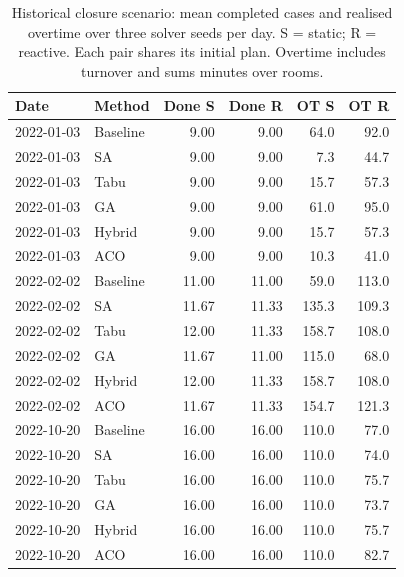 \begin{table}[H]
\centering\small
\caption{Historical closure scenario: mean completed cases and realised overtime over three solver seeds per day. S = static; R = reactive. Each pair shares its initial plan. Overtime includes turnover and sums minutes over rooms.}
\label{tab:room-historical}
\begin{tabular}{@{}llrrrr@{}}
\toprule
Date & Method & Done S & Done R & OT S & OT R \\
\midrule
2022-01-03 & Baseline & 9.00 & 9.00 & 64.0 & 92.0 \\
2022-01-03 & SA & 9.00 & 9.00 & 7.3 & 44.7 \\
2022-01-03 & Tabu & 9.00 & 9.00 & 15.7 & 57.3 \\
2022-01-03 & GA & 9.00 & 9.00 & 61.0 & 95.0 \\
2022-01-03 & Hybrid & 9.00 & 9.00 & 15.7 & 57.3 \\
2022-01-03 & ACO & 9.00 & 9.00 & 10.3 & 41.0 \\
2022-02-02 & Baseline & 11.00 & 11.00 & 59.0 & 113.0 \\
2022-02-02 & SA & 11.67 & 11.33 & 135.3 & 109.3 \\
2022-02-02 & Tabu & 12.00 & 11.33 & 158.7 & 108.0 \\
2022-02-02 & GA & 11.67 & 11.00 & 115.0 & 68.0 \\
2022-02-02 & Hybrid & 12.00 & 11.33 & 158.7 & 108.0 \\
2022-02-02 & ACO & 11.67 & 11.33 & 154.7 & 121.3 \\
2022-10-20 & Baseline & 16.00 & 16.00 & 110.0 & 77.0 \\
2022-10-20 & SA & 16.00 & 16.00 & 110.0 & 74.0 \\
2022-10-20 & Tabu & 16.00 & 16.00 & 110.0 & 75.7 \\
2022-10-20 & GA & 16.00 & 16.00 & 110.0 & 73.7 \\
2022-10-20 & Hybrid & 16.00 & 16.00 & 110.0 & 75.7 \\
2022-10-20 & ACO & 16.00 & 16.00 & 110.0 & 82.7 \\
\bottomrule
\end{tabular}
\end{table}
